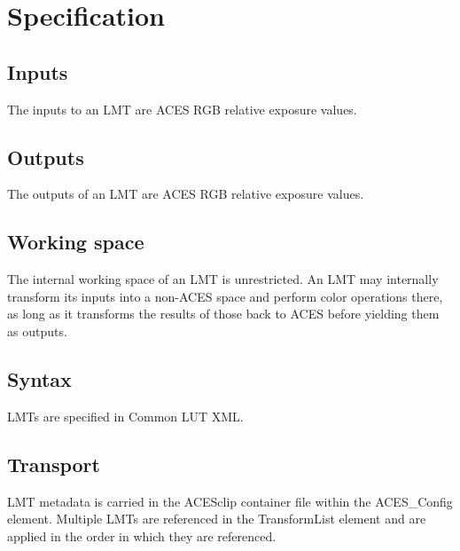 \regularsectionformat	%
\chapter{Specification}

\section{Inputs}
The inputs to an LMT are ACES RGB relative exposure values.

\section{Outputs}
The outputs of an LMT are ACES RGB relative exposure values.

\section{Working space}
The internal working space of an LMT is unrestricted. An LMT may internally transform its inputs into a non-ACES space and perform color operations there, as long as it transforms the results of those back to ACES before yielding them as outputs.

\section{Syntax}
LMTs are specified in Common LUT XML.

\section{Transport}
LMT metadata is carried in the ACESclip container file within the ACES\_Config element. Multiple LMTs are referenced in the TransformList element and are applied in the order in which they are referenced.